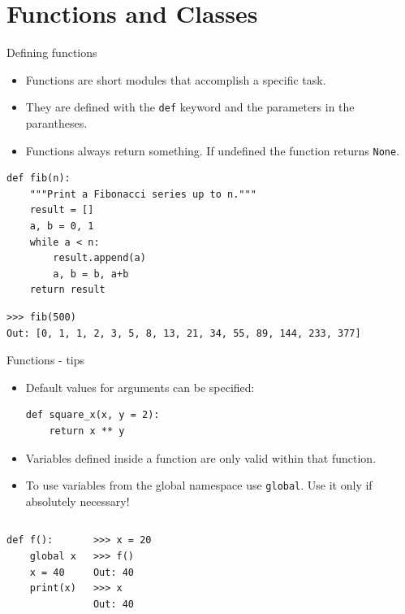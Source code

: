 \documentclass[compress%
,aspectratio=169%
]{beamer}
\newcommand{\code}{\lstinline}
\begin{document}
\section{Functions and Classes}
\begin{frame}[fragile]{Defining functions}
\begin{itemize}
\small
    \item Functions are short modules that accomplish a specific task.
    \item They are defined with the \code|def| keyword and the parameters in the parantheses.
    \item Functions always return something. If undefined the function returns \code|None|.
\end{itemize}

\begin{lstlisting}
def fib(n): 
    """Print a Fibonacci series up to n."""
    result = []
    a, b = 0, 1
    while a < n:
        result.append(a)        
        a, b = b, a+b
    return result
\end{lstlisting}

\begin{lstlisting}
>>> fib(500)
Out: [0, 1, 1, 2, 3, 5, 8, 13, 21, 34, 55, 89, 144, 233, 377] 
\end{lstlisting}
\end{frame}

\begin{frame}[fragile]{Functions - tips}
    \begin{itemize}
        \item Default values for arguments can be specified:
        \begin{lstlisting}
def square_x(x, y = 2):
    return x ** y
\end{lstlisting}
    \item Variables defined inside a function are \alert{only valid within that function}.
    \item To use variables from the global namespace use \code|global|. Use it only if \alert{absolutely necessary!}
        \end{itemize}

\begin{columns}
 \begin{lstlisting}
def f():
    global x
    x = 40
    print(x)
\end{lstlisting}

\begin{lstlisting}
>>> x = 20
>>> f()
Out: 40
>>> x
Out: 40
\end{lstlisting}
\end{columns}

\end{frame}
\end{document}
